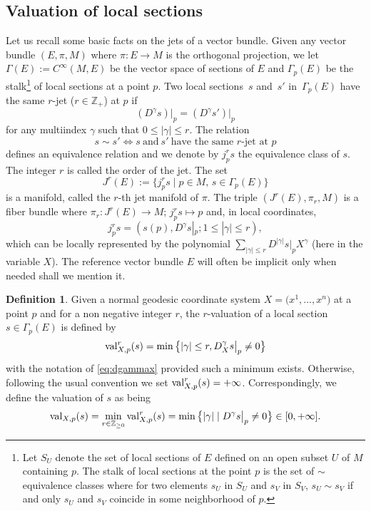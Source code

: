 \documentclass[10pt,a4paper]{amsart}
\numberwithin{equation}{section}
\theoremstyle{definition}
\newtheorem{defn}[thm]{Definition}
\newcommand{\Z}{\mathbb Z}
\begin{document}
\subsection{Valuation of local sections}
Let us recall some basic facts on the jets of a vector bundle. Given any vector bundle $(E,\pi, M)$ where $\pi\colon E\to M$ is the orthogonal projection, we let $\Gamma(E):=C^\infty(M,E)$ be the vector space of sections of $E$ and $\Gamma_p(E)$ be the stalk\footnote{Let $S_U$ denote the set of local sections of $E$ defined on an open subset $U$ of $M$ containing $p$. The stalk of local sections at the point $p$ is the set of $\sim$ equivalence classes where for two elements $s_U$ in $S_U$ and $s_V$ in $S_V$, $s_U\sim s_V$ if and only $s_U$ and $s_V$ coincide in some neighborhood of $p$.} of local sections at a point $p$. Two local sections~$s$ and~$s'$ in~$\Gamma_p(E)$ have the same $r$-jet ($r\in \mathbb{Z}_+$) at $p$ if
\[(D^{\gamma}s) \vert _p=(D^{\gamma}s') \vert _p\]
for any multiindex $\gamma$ such that $0\leq |\gamma|\leq r$. The relation
\[s\sim s'\iff s\ \text{and}\ s'\ \text{have the same $r$-jet at $p$}\]
defines an equivalence relation and we denote by $j_p^rs$ the equivalence class of $s$. The integer $r$ is called the order of the jet. The set
\[J^r(E):=\big\{j_p^rs\mid p\in M,\, s\in \Gamma_p(E)\big\}\]
is a manifold, called the $r$-th jet manifold of $\pi$. The triple $(J^r(E),\pi_r,M)$ is a fiber bundle where $\pi_r\colon J^r(E)\to M$; $j_p^rs\mapsto p$ and, in local coordinates,
\[j_p^rs=(s(p),D^{\gamma}s|_p; 1\leq |\gamma|\leq r),\]
which can be locally represented by the polynomial $\sum_{|\gamma|\leq r} D^{|\gamma|} s|_p X^\gamma$ (here in the variable $X$).
The reference vector bundle $E$ will often be implicit only when needed shall we mention it.
\begin{defn} Given a normal geodesic coordinate system $X=\bigl(x^1,\dots,x^n\bigr)$ at a point $p$ and for a non negative integer $r$, the $r$-valuation of a local section $s\in\Gamma_p(E)$ is defined by
\[{\rm val}^r_{X,p}(s)=\min \big\{ \vert\gamma\vert\leq r, D_X^{\gamma}s \big \vert _p\neq 0\big\}\]
with the notation of \eqref{eq:dgammax} provided such a minimum exists. Otherwise, following the usual convention we set ${\rm val}^r_{X,p}(s)=+\infty$.
Correspondingly, we define the valuation of $s$ as being
\begin{equation}\label{eq:valp}
{\rm val}_{X,p}(s)=\min _{r\in \Z_{\geq 0}} {\rm val}^r_{X, p}(s)=\min \big\{\vert\gamma\vert\mid D^{\gamma}s \big \vert _p\neq 0\big\} \in [0,+\infty].
\end{equation}
\end{defn}
\end{document}
